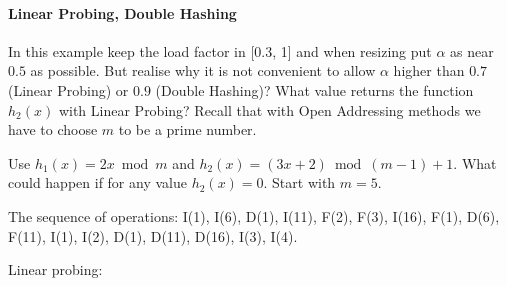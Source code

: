 \paragraph*{Linear Probing, Double Hashing}
In this example keep the load factor in [0.3, 1] and when resizing put $\alpha$ as near $0.5$ as possible. But realise why it is not convenient to allow $\alpha$ higher than $0.7$ (Linear Probing) or $0.9$ (Double Hashing)? What value returns the function $h_2(x)$ with Linear Probing? Recall that with Open Addressing methods we have to choose $m$ to be a prime number.

Use $h_1(x) = 2x \bmod m$ and $h_2(x) = (3x + 2) \bmod (m - 1) + 1$. What could happen if for any value $h_2(x) = 0$. Start with $m = 5$.

The sequence of operations: I(1), I(6), D(1), I(11), F(2), F(3), I(16), F(1), D(6), F(11), I(1), I(2), D(1), D(11), D(16), I(3), I(4). 

\vspace{0.5cm}
Linear probing:


